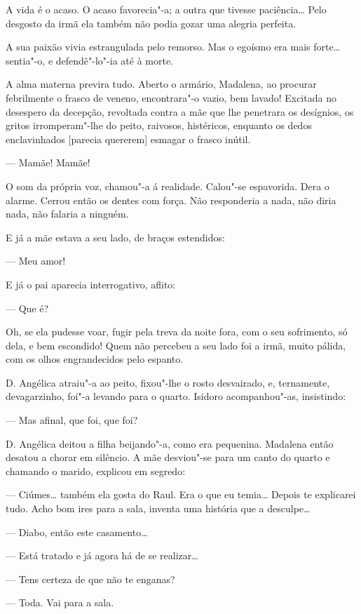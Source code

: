 A vida é o acaso. O acaso favorecia"-a; a outra que tivesse paciência\ldots{}
Pelo desgosto da irmã ela também não podia gozar uma alegria perfeita.

A sua paixão vivia estrangulada pelo remorso. Mas o egoísmo era mais
forte\ldots{} sentia"-o, e defendê"-lo"-ia até à morte.

A alma materna previra tudo. Aberto o armário, Madalena, ao procurar
febrilmente o frasco de veneno, encontrara"-o vazio, bem lavado! Excitada
no desespero da decepção, revoltada contra a mãe que lhe penetrara os
desígnios, os gritos irromperam"-lhe do peito, raivosos, histéricos,
enquanto os dedos enclavinhados {[}parecia quererem{]} esmagar o frasco
inútil.

--- Mamãe! Mamãe!

O som da própria voz, chamou"-a á realidade. Calou"-se espavorida. Dera o
alarme. Cerrou então os dentes com força. Não responderia a nada, não
diria nada, não falaria a ninguém.

E já a mãe estava a seu lado, de braços estendidos:

--- Meu amor!

E já o pai aparecia interrogativo, aflito:

--- Que é?

Oh, se ela pudesse voar, fugir pela treva da noite fora, com o seu
sofrimento, só dela, e bem escondido! Quem não percebeu a seu lado foi a
irmã, muito pálida, com os olhos engrandecidos pelo espanto.

D. Angélica atraiu"-a ao peito, fixou"-lhe o rosto desvairado, e,
ternamente, devagarzinho, foi"-a levando para o quarto. Isidoro
acompanhou"-as, insistindo:

--- Mas afinal, que foi, que foi?

D. Angélica deitou a filha beijando"-a, como era pequenina. Madalena
então desatou a chorar em silêncio. A mãe desviou"-se para um canto do
quarto e chamando o marido, explicou em segredo:

--- Ciúmes\ldots{} também ela gosta do Raul. Era o que eu temia\ldots{} Depois te
explicarei tudo. Acho bom ires para a sala, inventa uma história que a
desculpe\ldots{}

--- Diabo, então este casamento\ldots{}

--- Está tratado e já agora há de se realizar\ldots{}

--- Tens certeza de que não te enganas?

--- Toda. Vai para a sala.

